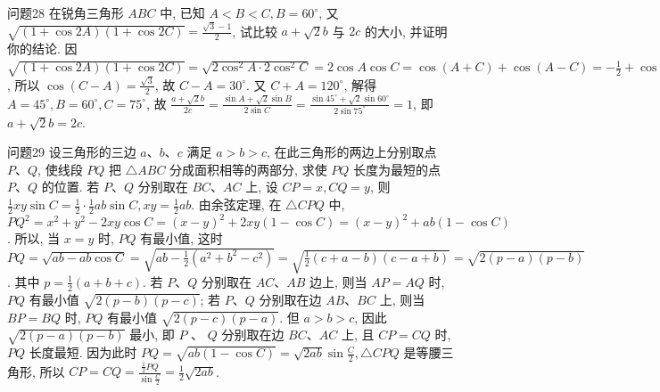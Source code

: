 问题28 在锐角三角形 $A B C$ 中, 已知 $A<B<C, B=60^{\circ}$, 又 $\sqrt{(1+\cos 2 A)(1+\cos 2 C)}= \frac{\sqrt{3}-1}{2}$, 试比较 $a+\sqrt{2} b$ 与 $2 c$ 的大小, 并证明你的结论.
因 $\sqrt{(1+\cos 2 A)(1+\cos 2 C)}=\sqrt{2 \cos ^2 A \cdot 2 \cos ^2 C}=2 \cos A \cos C=\cos (A+C)+\cos (A-C)=-\frac{1}{2}+\cos (A-C)=\frac{\sqrt{3}-1}{2}$, 所以 $\cos (C-A)= \frac{\sqrt{3}}{2}$, 故 $C-A=30^{\circ}$. 又 $C+A=120^{\circ}$, 解得 $A=45^{\circ}, B=60^{\circ}, C=75^{\circ}$, 故 $\frac{a+\sqrt{2} b}{2 c}=\frac{\sin A+\sqrt{2} \sin B}{2 \sin C}=\frac{\sin 45^{\circ}+\sqrt{2} \sin 60^{\circ}}{2 \sin 75^{\circ}}=1$, 即 $a+\sqrt{2} b=2 c$.



问题29 设三角形的三边 $a 、 b 、 c$ 满足 $a>b>c$, 在此三角形的两边上分别取点 $P 、 Q$, 使线段 $P Q$ 把 $\triangle A B C$ 分成面积相等的两部分, 求使 $P Q$ 长度为最短的点 $P 、 Q$ 的位置.
若 $P 、 Q$ 分别取在 $B C 、 A C$ 上, 设 $C P=x, C Q=y$, 则 $\frac{1}{2} x y \sin C= \frac{1}{2} \cdot \frac{1}{2} a b \sin C, x y=\frac{1}{2} a b$. 由余弦定理, 在 $\triangle C P Q$ 中, $P Q^2=x^2+y^2- 2 x y \cos C=(x-y)^2+2 x y(1-\cos C)=(x-y)^2+a b(1-\cos C)$. 所以, 当 $x=y$ 时, $P Q$ 有最小值, 这时 $P Q=\sqrt{a b-a b \cos C}=\sqrt{a b-\frac{1}{2}\left(a^2+b^2-c^2\right)}= \sqrt{\frac{1}{2}(c+a-b)(c-a+b)}=\sqrt{2(p-a)(p-b)}$. 其中 $p=\frac{1}{2}(a+b+c)$. 若 $P 、 Q$ 分别取在 $A C 、 A B$ 边上, 则当 $A P=A Q$ 时, $P Q$ 有最小值 $\sqrt{2(p-b)(p-c)}$; 若 $P 、 Q$ 分别取在边 $A B 、 B C$ 上, 则当 $B P=B Q$ 时, $P Q$ 有最小值 $\sqrt{2(p-c)(p-a)}$. 但 $a>b>c$, 因此 $\sqrt{2(p-a)(p-b)}$ 最小, 即 $P$ 、 $Q$ 分别取在边 $B C 、 A C$ 上, 且 $C P=C Q$ 时, $P Q$ 长度最短.
因为此时 $P Q= \sqrt{a b(1-\cos C)}=\sqrt{2 a b} \sin \frac{C}{2}, \triangle C P Q$ 是等腰三角形, 所以 $C P=C Q= \frac{\frac{1}{2} P Q}{\sin \frac{C}{2}}=\frac{1}{2} \sqrt{2 a b}$.



